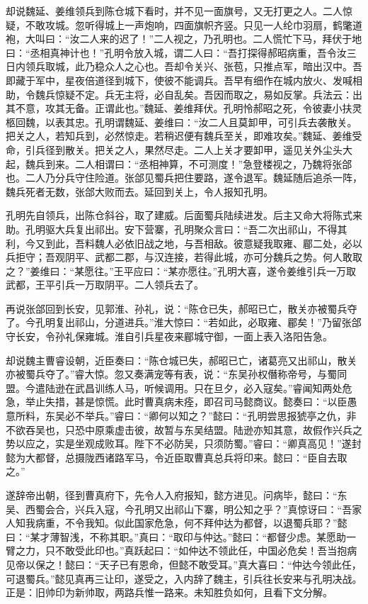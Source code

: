 却说魏延、姜维领兵到陈仓城下看时，并不见一面旗号，又无打更之人。二人惊疑，不敢攻城。忽听得城上一声炮响，四面旗帜齐竖。只见一人纶巾羽扇，鹤氅道袍，大叫曰：“汝二人来的迟了！”二人视之，乃孔明也。二人慌忙下马，拜伏于地曰：“丞相真神计也！”孔明令放入城，谓二人曰：“吾打探得郝昭病重，吾令汝三日内领兵取城，此乃稳众人之心也。吾却令关兴、张苞，只推点军，暗出汉中。吾即藏于军中，星夜倍道径到城下，使彼不能调兵。吾早有细作在城内放火、发喊相助，令魏兵惊疑不定。兵无主将，必自乱矣。吾因而取之，易如反掌。兵法云：出其不意，攻其无备。正谓此也。”魏延、姜维拜伏。孔明怜郝昭之死，令彼妻小扶灵柩回魏，以表其忠。孔明谓魏延、姜维曰：“汝二人且莫卸甲，可引兵去袭散关。把关之人，若知兵到，必然惊走。若稍迟便有魏兵至关，即难攻矣。”魏延、姜维受命，引兵径到散关。把关之人，果然尽走。二人上关才要卸甲，遥见关外尘头大起，魏兵到来。二人相谓曰：“丞相神算，不可测度！”急登楼视之，乃魏将张郃也。二人乃分兵守住险道。张郃见蜀兵把住要路，遂令退军。魏延随后追杀一阵，魏兵死者无数，张郃大败而去。延回到关上，令人报知孔明。

孔明先自领兵，出陈仓斜谷，取了建威。后面蜀兵陆续进发。后主又命大将陈式来助。孔明驱大兵复出祁出。安下营寨，孔明聚众言曰：“吾二次出祁山，不得其利，今又到此，吾料魏人必依旧战之地，与吾相敌。彼意疑我取雍、郿二处，必以兵拒守；吾观阴平、武都二郡，与汉连接，若得此城，亦可分魏兵之势。何人敢取之？”姜维曰：“某愿往。”王平应曰：“某亦愿往。”孔明大喜，遂令姜维引兵一万取武都，王平引兵一万取阴平。二人领兵去了。

再说张郃回到长安，见郭淮、孙礼，说：“陈仓已失，郝昭已亡，散关亦被蜀兵夺了。今孔明复出祁山，分道进兵。”淮大惊曰：“若如此，必取雍、郿矣！”乃留张郃守长安，令孙礼保雍城。淮自引兵星夜来郿城守御，一面上表入洛阳告急。

却说魏主曹睿设朝，近臣奏曰：“陈仓城已失，郝昭已亡，诸葛亮又出祁山，散关亦被蜀兵夺了。”睿大惊。忽又奏满宠等有表，说：“东吴孙权僭称帝号，与蜀同盟。今遣陆逊在武昌训练人马，听候调用。只在旦夕，必入寇矣。”睿闻知两处危急，举止失措，甚是惊慌。此时曹真病未痊，即召司马懿商议。懿奏曰：“以臣愚意所料，东吴必不举兵。”睿曰：“卿何以知之？”懿曰：“孔明尝思报猇亭之仇，非不欲吞吴也，只恐中原乘虚击彼，故暂与东吴结盟。陆逊亦知其意，故假作兴兵之势以应之，实是坐观成败耳。陛下不必防吴，只须防蜀。”睿曰：“卿真高见！”遂封懿为大都督，总摄陇西诸路军马，令近臣取曹真总兵将印来。懿曰：“臣自去取之。”

遂辞帝出朝，径到曹真府下，先令人入府报知，懿方进见。问病毕，懿曰：“东吴、西蜀会合，兴兵入寇，今孔明又出祁山下寨，明公知之乎？”真惊讶曰：“吾家人知我病重，不令我知。似此国家危急，何不拜仲达为都督，以退蜀兵耶？”懿曰：“某才薄智浅，不称其职。”真曰：“取印与仲达。”懿曰：“都督少虑。某愿助一臂之力，只不敢受此印也。”真跃起曰：“如仲达不领此任，中国必危矣！吾当抱病见帝以保之！懿曰：“天子已有恩命，但懿不敢受耳。”真大喜曰：“仲达今领此任，可退蜀兵。”懿见真再三让印，遂受之，入内辞了魏主，引兵往长安来与孔明决战。正是：旧帅印为新帅取，两路兵惟一路来。未知胜负如何，且看下文分解。
